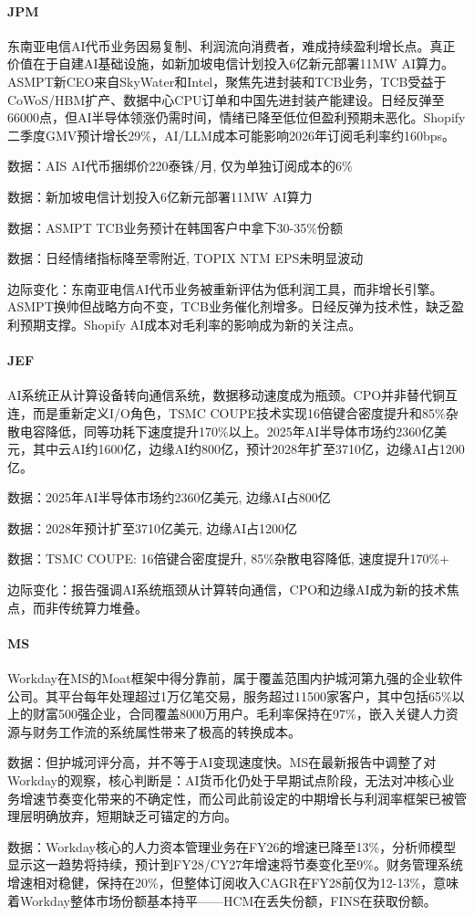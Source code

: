 \documentclass[11pt]{ctexart}
\begin{document}
\paragraph{JPM} 东南亚电信AI代币业务因易复制、利润流向消费者，难成持续盈利增长点。真正价值在于自建AI基础设施，如新加坡电信计划投入6亿新元部署11MW AI算力。ASMPT新CEO来自SkyWater和Intel，聚焦先进封装和TCB业务，TCB受益于CoWoS/HBM扩产、数据中心CPU订单和中国先进封装产能建设。日经反弹至66000点，但AI半导体领涨仍需时间，情绪已降至低位但盈利预期未恶化。Shopify二季度GMV预计增长29\%，AI/LLM成本可能影响2026年订阅毛利率约160bps。
{\small\color{refgray}数据：AIS AI代币捆绑价220泰铢/月, 仅为单独订阅成本的6\%\par}
{\small\color{refgray}数据：新加坡电信计划投入6亿新元部署11MW AI算力\par}
{\small\color{refgray}数据：ASMPT TCB业务预计在韩国客户中拿下30-35\%份额\par}
{\small\color{refgray}数据：日经情绪指标降至零附近, TOPIX NTM EPS未明显波动\par}
{\small\color{refgray}边际变化：东南亚电信AI代币业务被重新评估为低利润工具，而非增长引擎。ASMPT换帅但战略方向不变，TCB业务催化剂增多。日经反弹为技术性，缺乏盈利预期支撑。Shopify AI成本对毛利率的影响成为新的关注点。\par}
\paragraph{JEF} AI系统正从计算设备转向通信系统，数据移动速度成为瓶颈。CPO并非替代铜互连，而是重新定义I/O角色，TSMC COUPE技术实现16倍键合密度提升和85\%杂散电容降低，同等功耗下速度提升170\%以上。2025年AI半导体市场约2360亿美元，其中云AI约1600亿，边缘AI约800亿，预计2028年扩至3710亿，边缘AI占1200亿。
{\small\color{refgray}数据：2025年AI半导体市场约2360亿美元, 边缘AI占800亿\par}
{\small\color{refgray}数据：2028年预计扩至3710亿美元, 边缘AI占1200亿\par}
{\small\color{refgray}数据：TSMC COUPE: 16倍键合密度提升, 85\%杂散电容降低, 速度提升170\%+\par}
{\small\color{refgray}边际变化：报告强调AI系统瓶颈从计算转向通信，CPO和边缘AI成为新的技术焦点，而非传统算力堆叠。\par}
\paragraph{MS} Workday在MS的Moat框架中得分靠前，属于覆盖范围内护城河第九强的企业软件公司。其平台每年处理超过1万亿笔交易，服务超过11500家客户，其中包括65\%以上的财富500强企业，合同覆盖8000万用户。毛利率保持在97\%，嵌入关键人力资源与财务工作流的系统属性带来了极高的转换成本。
{\small\color{refgray}数据：但护城河评分高，并不等于AI变现速度快。MS在最新报告中调整了对Workday的观察，核心判断是：AI货币化仍处于早期试点阶段，无法对冲核心业务增速节奏变化带来的不确定性，而公司此前设定的中期增长与利润率框架已被管理层明确放弃，短期缺乏可锚定的方向。\par}
{\small\color{refgray}数据：Workday核心的人力资本管理业务在FY26的增速已降至13\%，分析师模型显示这一趋势将持续，预计到FY28/CY27年增速将节奏变化至9\%。财务管理系统增速相对稳健，保持在20\%，但整体订阅收入CAGR在FY28前仅为12-13\%，意味着Workday整体市场份额基本持平——HCM在丢失份额，FINS在获取份额。\par}
\end{document}
